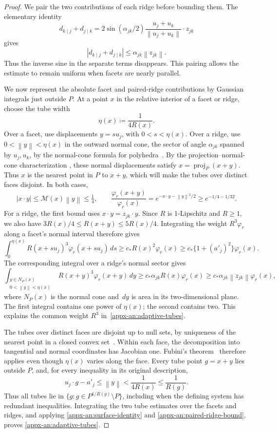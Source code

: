 \documentclass[11pt,letterpaper]{article}
\theoremstyle{remark}
\newcommand{\norm}[1]{\left\lVert#1\right\rVert}
\newcommand{\dd}{\,d}
\begin{document}
\begin{proof}
We pair the two contributions of each ridge before bounding them.
The elementary identity
\[
 d_{k\mid j}+d_{j\mid k}
 =2\sin(\alpha_{jk}/2)
       \frac{u_j+u_k}{\norm{u_j+u_k}}\cdot z_{jk}
\]
gives
\begin{equation}
 |d_{k\mid j}+d_{j\mid k}|\le\alpha_{jk}\norm{z_{jk}}.
 \label{appx-an:paired-ridge-bound}
\end{equation}
Thus the inverse sine in the separate terms disappears. This pairing
allows the estimate to remain uniform when facets are nearly parallel.

We now represent the absolute facet and paired-ridge contributions
by Gaussian integrals just outside \(P\). At a point \(x\) in the
relative interior of a facet or ridge, choose the tube width
\[
 \eta(x)\coloneqq \frac1{4R(x)}.
\]
Over a facet, use displacements \(y=s u_j\), with \(0<s<\eta(x)\).
Over a ridge, use \(0<\norm y<\eta(x)\) in the outward normal cone,
the sector of angle \(\alpha_{jk}\) spanned by \(u_j,u_k\), by the
normal-cone formula for polyhedra~\cite[Theorem~6.46]{RockafellarWets1998}.
By the projection--normal-cone characterization
\cite[Proposition~6.17]{RockafellarWets1998}, these normal displacements
satisfy \(x=\operatorname{proj}_P(x+y)\). Thus \(x\) is the nearest point
in \(P\) to \(x+y\), which will make the tubes over distinct faces
disjoint. In both cases,
\[
 |x\cdot y|\le\mathcal M(x)\norm y\le\tfrac14,\qquad
 \frac{\varphi_r(x+y)}{\varphi_r(x)}
       =e^{-x\cdot y-\norm y^2/2}\ge e^{-1/4-1/32}.
\]
For a ridge, the first bound uses \(x\cdot y=z_{jk}\cdot y\).
Since \(R\) is \(1\)-Lipschitz and \(R\ge1\), we also have
\(3R(x)/4\le R(x+y)\le5R(x)/4\).
Integrating the weight \(R^3\varphi_r\) along a facet's normal
interval therefore gives
\[
 \int_0^{\eta(x)} R(x+s u_j)^3\varphi_r(x+s u_j)\dd s
 \ge c_*R(x)^2\varphi_r(x)
 \ge c_*\{1+(a'_j)^2\}\varphi_r(x).
\]
The corresponding integral over a ridge's normal sector gives
\[
 \int_{\substack{y\in N_P(x)\\0<\norm y<\eta(x)}}
        R(x+y)^3\varphi_r(x+y)\dd y
 \ge c_*\alpha_{jk}R(x)\varphi_r(x)
 \ge c_*\alpha_{jk}\norm{z_{jk}}\varphi_r(x),
\]
where \(N_P(x)\) is the normal cone and \(\dd y\) is area in its
two-dimensional plane. The first integral contains one power of
\(\eta(x)\); the second contains two. This explains the common weight
\(R^3\) in~\eqref{appx-an:adaptive-tubes}.

The tubes over distinct faces are disjoint up to null sets, by
uniqueness of the nearest point in a closed convex
set~\cite[Example~2.25]{RockafellarWets1998}. Within each
face, the decomposition into tangential and normal coordinates has
Jacobian one. Fubini's theorem~\cite[Section~2.5]{Folland1999}
therefore applies even though
\(\eta(x)\) varies along the face. Every tube point \(g=x+y\) lies
outside \(P\), and, for every inequality in its original description,
\[
 u_j\cdot g-a'_j\le\norm y<\frac1{4R(x)}\le\frac1{R(g)}.
\]
Thus all tubes lie in \(\{g:g\in P^{1/R(g)}\setminus P\}\), including
when the defining system has redundant inequalities. Integrating the
two tube estimates over the facets and ridges, and applying
\eqref{appx-an:surface-identity} and
\eqref{appx-an:paired-ridge-bound}, proves
\eqref{appx-an:adaptive-tubes}.


\end{proof}
\end{document}
